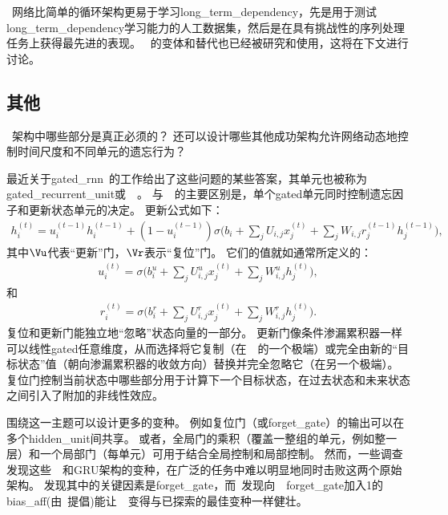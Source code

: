 
~网络比简单的循环架构更易于学习\gls{long_term_dependency}，先是用于测试\gls{long_term_dependency}学习能力的人工数据集\citep{Bengio-et-al-1994,Hochreiter-Schmidhuber-1997,Hochreiter-et-al-2001}，然后是在具有挑战性的序列处理任务上获得最先进的表现\citep{Graves-2012,Graves-et-al-2013,Sutskever-et-al-2014}。
~的变体和替代也已经被研究和使用，这将在下文进行讨论。

\subsection{其他}
\label{sec:other_gated_rnns}
~架构中哪些部分是真正必须的？
还可以设计哪些其他成功架构允许网络动态地控制时间尺度和不同单元的遗忘行为？

最近关于\gls{gated_rnn}~的工作给出了这些问题的某些答案，其单元也被称为\gls{gated_recurrent_unit}或~~\citep{Cho-et-al-2014b,Chung-et-al-2014,Chung-et-al-2015a,Jozefowicz-et-al-2015,Chrupala-et-al-2015}。
与~~的主要区别是，单个\gls{gated}单元同时控制遗忘因子和更新状态单元的决定。
更新公式如下：
\begin{align}
 h_i^{(t)} = u_i^{(t-1)} h_i^{(t-1)} + (1 - u_i^{(t-1)}) \sigma 
 \Big( b_i + \sum_j U_{i,j} x_j^{(t)} + \sum_j W_{i,j} r_j^{(t-1)} h_j^{(t-1)} \Big),
\end{align}
其中$\Vu$代表``更新''门，$\Vr$表示``复位''门。
它们的值就如通常所定义的：
\begin{align}
 u_i^{(t)} = \sigma \Big( b_i^u + \sum_j U_{i,j}^u x_j^{(t)} + \sum_j W_{i,j}^u h_j^{(t)} \Big),
\end{align}
和
\begin{align}
 r_i^{(t)} = \sigma \Big( b_i^r + \sum_j U_{i,j}^r x_j^{(t)} + \sum_j W_{i,j}^r h_j^{(t)} \Big).
\end{align}
复位和更新门能独立地``忽略''状态向量的一部分。
更新门像条件渗漏累积器一样可以线性\gls{gated}任意维度，从而选择将它复制（在~~的一个极端）或完全由新的``目标状态''值（朝向渗漏累积器的收敛方向）替换并完全忽略它（在另一个极端）。
复位门控制当前状态中哪些部分用于计算下一个目标状态，在过去状态和未来状态之间引入了附加的非线性效应。


围绕这一主题可以设计更多的变种。
例如复位门（或\gls{forget_gate}）的输出可以在多个\gls{hidden_unit}间共享。
或者，全局门的乘积（覆盖一整组的单元，例如整一层）和一个局部门（每单元）可用于结合全局控制和局部控制。
然而，一些调查发现这些~~和GRU架构的变种，在广泛的任务中难以明显地同时击败这两个原始架构\citep{Greff-et-al-2015,Jozefowicz-et-al-2015}。
\cite{Greff-et-al-2015}发现其中的关键因素是\gls{forget_gate}，而~\cite{Jozefowicz-et-al-2015}发现向~~\gls{forget_gate}加入1的\gls{bias_aff}(由~\cite{Gers-et-al-2000}提倡)能让~~变得与已探索的最佳变种一样健壮。

